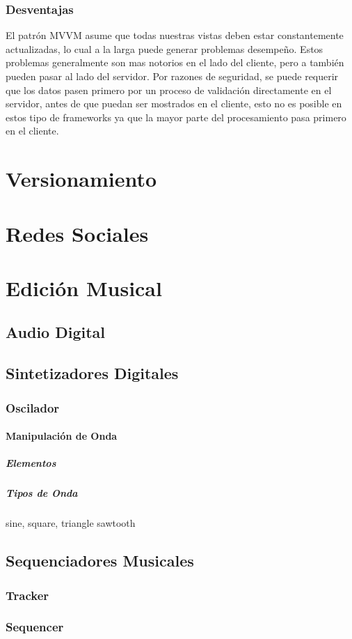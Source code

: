 \subsubsection{Desventajas}
El patrón MVVM asume que todas nuestras vistas deben estar constantemente
actualizadas, lo cual a la larga puede generar problemas desempeño. Estos
problemas generalmente son mas notorios en el lado del cliente, pero a también
pueden pasar al lado del servidor.
Por razones de seguridad, se puede requerir que los datos
pasen primero por un proceso de validación directamente en el servidor,
antes de que puedan ser mostrados en el cliente, esto no es posible en
estos tipo de frameworks ya que la mayor parte del procesamiento pasa
primero en el cliente.

\section{Versionamiento}
\section{Redes Sociales}

\section{Edición Musical}
  \subsection{Audio Digital}
  \subsection{Sintetizadores Digitales}
    \subsubsection{Oscilador}
      \paragraph{Manipulación de Onda}
        \subparagraph{Elementos}
        \subparagraph{Tipos de Onda}
        sine, square, triangle sawtooth
  \subsection{Sequenciadores Musicales}
    \subsubsection{Tracker}
    \subsubsection{Sequencer}
